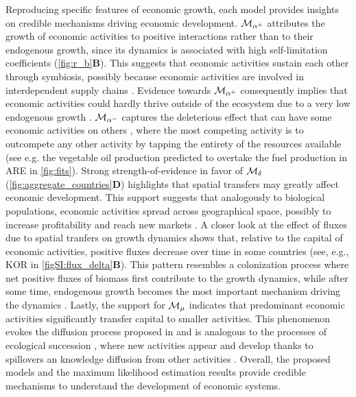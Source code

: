 Reproducing specific features of economic growth, each model provides insights on credible mechanisms driving economic development.
% 
$\mathcal{M}_{\alpha^+}$ attributes the growth of economic activities to positive interactions rather than to their endogenous growth, since its dynamics is associated with high self-limitation coefficients (\cref{fig:r_b}\textbf{B}). This suggests that economic activities sustain each other through symbiosis, possibly because economic activities are involved in interdependent supply chains \citep{Ozman2009,Saavedra2009a}. Evidence towards $\mathcal{M}_{\alpha^+}$ consequently implies that economic activities could hardly thrive outside of the ecosystem due to a very low endogenous growth \citep{Yukalov2012}.
% 
$\mathcal{M}_{\alpha^-}$ captures the deleterious effect that can have some economic activities on others \citep{Wernerfelt1989}, where the most competing activity is to outcompete any other activity by tapping the entirety of the resources available (see e.g. the vegetable oil production predicted to overtake the fuel production in ARE in \cref{fig:fits}).
% 
Strong strength-of-evidence in favor of $\mathcal{M}_\delta$ (\cref{fig:aggregate_countries}\textbf{D}) highlights that spatial transfers may greatly affect economic development. This support suggests that analogously to biological populations, economic activities spread across geographical space, possibly to increase profitability and reach new markets \citep{Luo2007}.
% 
A closer look at the effect of fluxes due to spatial tranfers on growth dynamics shows that, relative to the capital of economic activities, positive fluxes decrease over time in some countries (see, e.g., KOR in \cref{figSI:flux_delta}\textbf{B}). This pattern resembles a colonization process where net positive fluxes of biomass first contribute to the growth dynamics, while after some time, endogenous growth becomes the most important mechanism driving the dynamics \citep{Leibold2004}. 
%
Lastly, the support for $\mathcal{M}_\mu$ indicates that predominant economic activities significantly transfer capital to smaller activities. This phenomenon evokes the diffusion process proposed in \citep{C.A.HidalgoB.Klinger} and is analogous to the processes of ecological succession \citep{Odum1969}, where new activities appear and develop thanks to spillovers an knowledge diffusion from other activities \citep{}.
% 
Overall, the proposed models and the maximum likelihood estimation results provide credible mechanisms to understand the development of economic systems.

